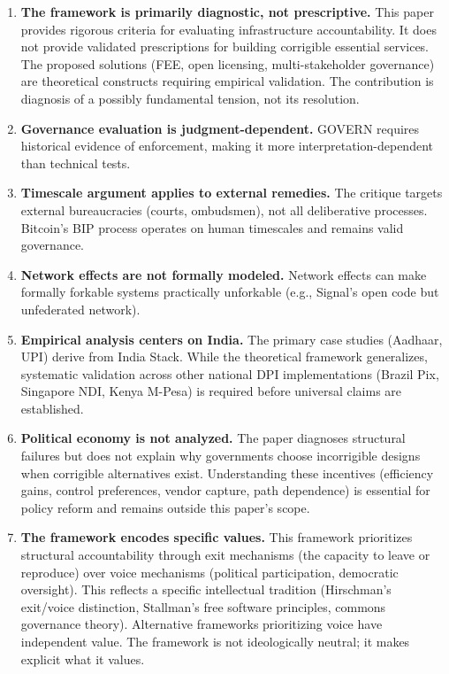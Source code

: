 \documentclass{article}
\begin{document}
\begin{enumerate}
    \item \textbf{The framework is primarily diagnostic, not prescriptive.} This paper provides rigorous criteria for evaluating infrastructure accountability. It does not provide validated prescriptions for building corrigible essential services. The proposed solutions (FEE, open licensing, multi-stakeholder governance) are theoretical constructs requiring empirical validation. The contribution is diagnosis of a possibly fundamental tension, not its resolution.

    \item \textbf{Governance evaluation is judgment-dependent.} GOVERN requires historical evidence of enforcement, making it more interpretation-dependent than technical tests.

    \item \textbf{Timescale argument applies to external remedies.} The critique targets external bureaucracies (courts, ombudsmen), not all deliberative processes. Bitcoin's BIP process operates on human timescales and remains valid governance.

    \item \textbf{Network effects are not formally modeled.} Network effects can make formally forkable systems practically unforkable (e.g., Signal's open code but unfederated network).

    \item \textbf{Empirical analysis centers on India.} The primary case studies (Aadhaar, UPI) derive from India Stack. While the theoretical framework generalizes, systematic validation across other national DPI implementations (Brazil Pix, Singapore NDI, Kenya M-Pesa) is required before universal claims are established.

    \item \textbf{Political economy is not analyzed.} The paper diagnoses structural failures but does not explain why governments choose incorrigible designs when corrigible alternatives exist. Understanding these incentives (efficiency gains, control preferences, vendor capture, path dependence) is essential for policy reform and remains outside this paper's scope.

    \item \textbf{The framework encodes specific values.} This framework prioritizes structural accountability through exit mechanisms (the capacity to leave or reproduce) over voice mechanisms (political participation, democratic oversight). This reflects a specific intellectual tradition (Hirschman's exit/voice distinction, Stallman's free software principles, commons governance theory). Alternative frameworks prioritizing voice have independent value. The framework is not ideologically neutral; it makes explicit what it values.


\end{enumerate}
\end{document}
